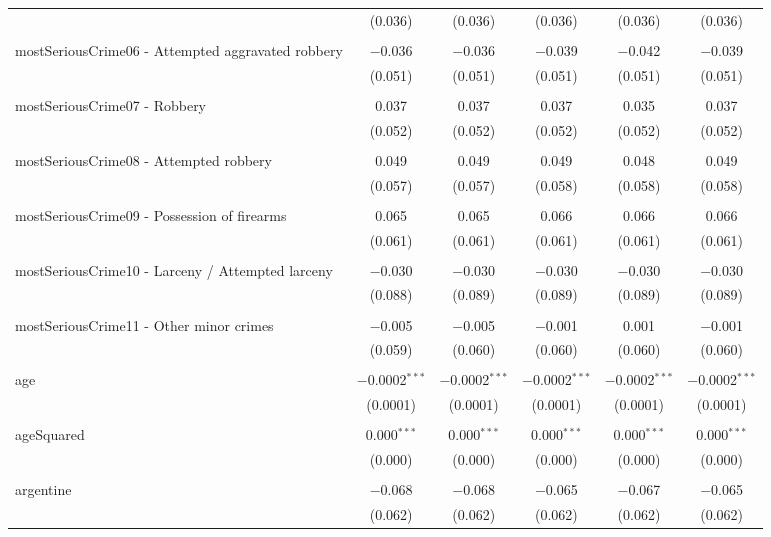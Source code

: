 \documentclass{article}
\begin{document}
\begin{table}[!htbp]
{\begin{tabular}{@{\extracolsep{5pt}}lccccc}
  & (0.036) & (0.036) & (0.036) & (0.036) & (0.036) \\ 
  & & & & & \\ 
 mostSeriousCrime06 - Attempted aggravated robbery & $-$0.036 & $-$0.036 & $-$0.039 & $-$0.042 & $-$0.039 \\ 
  & (0.051) & (0.051) & (0.051) & (0.051) & (0.051) \\ 
  & & & & & \\ 
 mostSeriousCrime07 - Robbery & 0.037 & 0.037 & 0.037 & 0.035 & 0.037 \\ 
  & (0.052) & (0.052) & (0.052) & (0.052) & (0.052) \\ 
  & & & & & \\ 
 mostSeriousCrime08 - Attempted robbery & 0.049 & 0.049 & 0.049 & 0.048 & 0.049 \\ 
  & (0.057) & (0.057) & (0.058) & (0.058) & (0.058) \\ 
  & & & & & \\ 
 mostSeriousCrime09 - Possession of firearms & 0.065 & 0.065 & 0.066 & 0.066 & 0.066 \\ 
  & (0.061) & (0.061) & (0.061) & (0.061) & (0.061) \\ 
  & & & & & \\ 
 mostSeriousCrime10 - Larceny / Attempted larceny & $-$0.030 & $-$0.030 & $-$0.030 & $-$0.030 & $-$0.030 \\ 
  & (0.088) & (0.089) & (0.089) & (0.089) & (0.089) \\ 
  & & & & & \\ 
 mostSeriousCrime11 - Other minor crimes & $-$0.005 & $-$0.005 & $-$0.001 & 0.001 & $-$0.001 \\ 
  & (0.059) & (0.060) & (0.060) & (0.060) & (0.060) \\ 
  & & & & & \\ 
 age & $-$0.0002$^{***}$ & $-$0.0002$^{***}$ & $-$0.0002$^{***}$ & $-$0.0002$^{***}$ & $-$0.0002$^{***}$ \\ 
  & (0.0001) & (0.0001) & (0.0001) & (0.0001) & (0.0001) \\ 
  & & & & & \\ 
 ageSquared & 0.000$^{***}$ & 0.000$^{***}$ & 0.000$^{***}$ & 0.000$^{***}$ & 0.000$^{***}$ \\ 
  & (0.000) & (0.000) & (0.000) & (0.000) & (0.000) \\ 
  & & & & & \\ 
 argentine & $-$0.068 & $-$0.068 & $-$0.065 & $-$0.067 & $-$0.065 \\ 
  & (0.062) & (0.062) & (0.062) & (0.062) & (0.062) \\ 

\end{tabular}}
\end{table}
\end{document}
